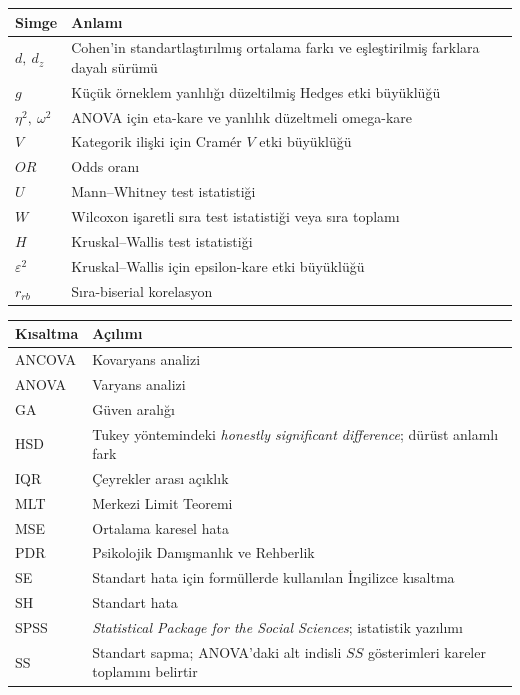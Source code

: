 \par\smallskip
\begin{center}
\begin{tabular}{@{}>{\RaggedRight\arraybackslash}p{}>{\RaggedRight\arraybackslash}p{}@{}}
\toprule
\textbf{Simge} & \textbf{Anlamı} \\
\midrule
$d,\ d_z$ & Cohen'in standartlaştırılmış ortalama farkı ve eşleştirilmiş farklara dayalı sürümü \\
$g$ & Küçük örneklem yanlılığı düzeltilmiş Hedges etki büyüklüğü \\
$\eta^2,\ \omega^2$ & ANOVA için eta-kare ve yanlılık düzeltmeli omega-kare \\
$V$ & Kategorik ilişki için Cramér $V$ etki büyüklüğü \\
$OR$ & Odds oranı \\
$U$ & Mann--Whitney test istatistiği \\
$W$ & Wilcoxon işaretli sıra test istatistiği veya sıra toplamı \\
$H$ & Kruskal--Wallis test istatistiği \\
$\varepsilon^2$ & Kruskal--Wallis için epsilon-kare etki büyüklüğü \\
$r_{rb}$ & Sıra-biserial korelasyon \\
\bottomrule
\end{tabular}
\end{center}

\par\smallskip
\begin{center}
\begin{tabular}{@{}>{\RaggedRight\arraybackslash}p{}>{\RaggedRight\arraybackslash}p{}@{}}
\toprule
\textbf{Kısaltma} & \textbf{Açılımı} \\
\midrule
ANCOVA & Kovaryans analizi \\
ANOVA & Varyans analizi \\
GA & Güven aralığı \\
HSD & Tukey yöntemindeki \textit{honestly significant difference}; dürüst anlamlı fark \\
IQR & Çeyrekler arası açıklık \\
MLT & Merkezi Limit Teoremi \\
MSE & Ortalama karesel hata \\
PDR & Psikolojik Danışmanlık ve Rehberlik \\
SE & Standart hata için formüllerde kullanılan İngilizce kısaltma \\
SH & Standart hata \\
SPSS & \textit{Statistical Package for the Social Sciences}; istatistik yazılımı \\
SS & Standart sapma; ANOVA'daki alt indisli $SS$ gösterimleri kareler toplamını belirtir \\
\bottomrule
\end{tabular}
\end{center}

\endgroup
\normalsize